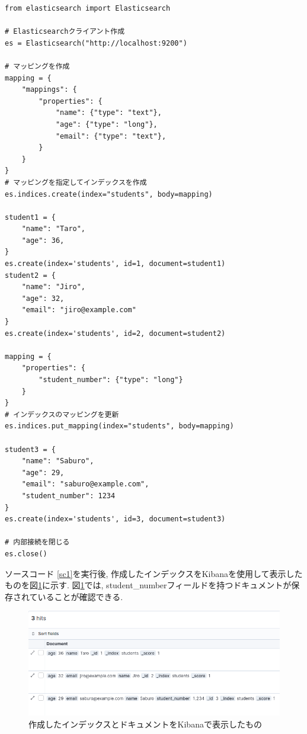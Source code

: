 \documentclass[a4j,12pt,]{jarticle}
\begin{document}
\begin{lstlisting}[caption=Elasticsearchにインデックスとドキュメントを作成するプログラム, label=sc1]
from elasticsearch import Elasticsearch

# Elasticsearchクライアント作成
es = Elasticsearch("http://localhost:9200")

# マッピングを作成
mapping = {
    "mappings": {
        "properties": {
            "name": {"type": "text"},
            "age": {"type": "long"},
            "email": {"type": "text"},
        }
    }
}
# マッピングを指定してインデックスを作成
es.indices.create(index="students", body=mapping)

student1 = {
    "name": "Taro",
    "age": 36,
}
es.create(index='students', id=1, document=student1)
student2 = {
    "name": "Jiro",
    "age": 32,
    "email": "jiro@example.com"
}
es.create(index='students', id=2, document=student2)

mapping = {
    "properties": {
        "student_number": {"type": "long"}
    }
}
# インデックスのマッピングを更新
es.indices.put_mapping(index="students", body=mapping)

student3 = {
    "name": "Saburo",
    "age": 29,
    "email": "saburo@example.com",
    "student_number": 1234
}
es.create(index='students', id=3, document=student3)

# 内部接続を閉じる
es.close()
\end{lstlisting}

ソースコード \ref{sc1}を実行後, 作成したインデックスをKibanaを使用して表示したものを図\ref{p1}に示す.
図\ref{p1}では, student\_numberフィールドを持つドキュメントが保存されていることが確認できる.

\begin{figure}[H]
  \begin{center}
    \includegraphics[width=160mm]{kibana.png}
    \caption{作成したインデックスとドキュメントをKibanaで表示したもの}
    \label{p1}
  \end{center}
\end{figure}
\end{document}
